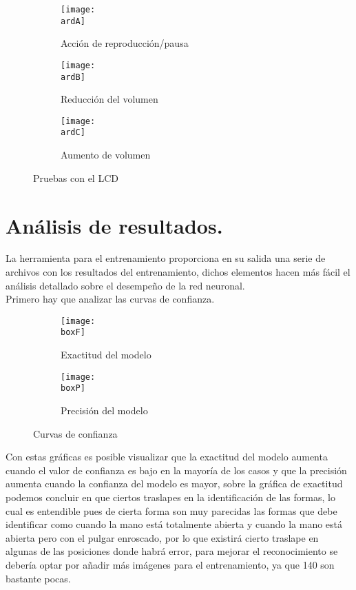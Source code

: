 \documentclass[a4paper, 12pt]{article}
\newcommand{\ardA}{img/ard_1.png}
\newcommand{\ardB}{img/ard_2.png}
\newcommand{\ardC}{img/ard_3.png}
\newcommand{\boxF}{img/BoxF1_curve.png}
\newcommand{\boxP}{img/BoxP_curve.png}
\begin{document}
	\begin{figure}[H]
		\begin{subfigure}[h]{0.5\textwidth}
			\texttt{[image: \\ardA]}
			\caption{Acción de reproducción/pausa}
		\end{subfigure}
		\begin{subfigure}[h]{0.5\textwidth}
			\texttt{[image: \\ardB]}
			\caption{Reducción del volumen}
		\end{subfigure}
		\begin{subfigure}[h]{1\textwidth}
			\centering
			\texttt{[image: \\ardC]}
			\caption{Aumento de volumen}
		\end{subfigure}
		\caption{Pruebas con el LCD}
	\end{figure}
	\clearpage

	\section{Análisis de resultados.}
	La herramienta para el entrenamiento proporciona en su salida una serie de archivos con los resultados del entrenamiento, dichos elementos hacen más fácil el análisis detallado sobre el desempeño de la red neuronal.\\
    Primero hay que analizar las curvas de confianza.

	\begin{figure}[H]
        \centering
		\begin{subfigure}{0.45\linewidth}
			\texttt{[image: \\boxF]}
			\label{F1_curve}
			\caption{Exactitud del modelo}
		\end{subfigure}
		\begin{subfigure}{0.45\linewidth}
			\texttt{[image: \\boxP]}
			\label{P_curve}
			\caption{Precisión del modelo}
		\end{subfigure}
		\caption{Curvas de confianza}
	\end{figure}

	Con estas gráficas es posible visualizar que la exactitud del modelo aumenta cuando el valor de confianza es bajo en la mayoría de los casos y que la precisión aumenta cuando la confianza del modelo es mayor, sobre la gráfica de exactitud podemos concluir en que ciertos traslapes en la identificación de las formas, lo cual es entendible pues de cierta forma son muy parecidas las formas que debe identificar como cuando la mano está totalmente abierta y cuando la mano está abierta pero con el pulgar enroscado, por lo que existirá cierto traslape en algunas de las posiciones donde habrá error, para mejorar el reconocimiento se debería optar por añadir más imágenes para el entrenamiento, ya que 140 son bastante pocas.
\end{document}
